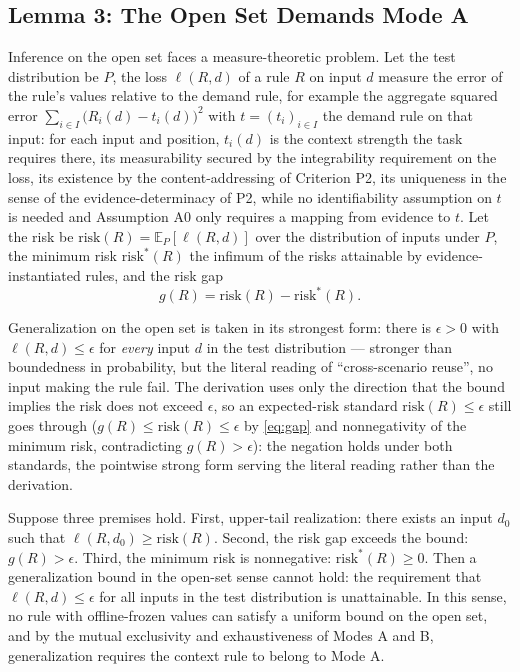 \subsection{Lemma 3: The Open Set Demands Mode A}

Inference on the open set faces a measure-theoretic problem. Let the test distribution be $P$, the loss $\ell(R, d)$ of a rule $R$ on input $d$ measure the error of the rule's values relative to the demand rule, for example the aggregate squared error $\sum_{i \in I} \bigl(R_i(d) - t_i(d)\bigr)^2$ with $t = (t_i)_{i \in I}$ the demand rule on that input: for each input and position, $t_i(d)$ is the context strength the task requires there, its measurability secured by the integrability requirement on the loss, its existence by the content-addressing of Criterion P2, its uniqueness in the sense of the evidence-determinacy of P2, while no identifiability assumption on $t$ is needed and Assumption A0 only requires a mapping from evidence to $t$. Let the risk be $\mathrm{risk}(R) = \mathbb{E}_P [\ell(R, d)]$ over the distribution of inputs under $P$, the minimum risk $\mathrm{risk}^* (R)$ the infimum of the risks attainable by evidence-instantiated rules, and the risk gap
\begin{equation}
g(R) = \mathrm{risk}(R) - \mathrm{risk}^* (R).
\label{eq:gap}
\end{equation}

Generalization on the open set is taken in its strongest form: there is $\epsilon > 0$ with $\ell(R, d) \le \epsilon$ for \emph{every} input $d$ in the test distribution --- stronger than boundedness in probability, but the literal reading of ``cross-scenario reuse'', no input making the rule fail. The derivation uses only the direction that the bound implies the risk does not exceed $\epsilon$, so an expected-risk standard $\mathrm{risk}(R) \le \epsilon$ still goes through ($g(R) \le \mathrm{risk}(R) \le \epsilon$ by \eqref{eq:gap} and nonnegativity of the minimum risk, contradicting $g(R) > \epsilon$): the negation holds under both standards, the pointwise strong form serving the literal reading rather than the derivation.

\begin{lemma}
Suppose three premises hold. First, upper-tail realization: there exists an input $d_0$ such that $\ell(R, d_0) \ge \mathrm{risk}(R)$. Second, the risk gap exceeds the bound: $g(R) > \epsilon$. Third, the minimum risk is nonnegative: $\mathrm{risk}^* (R) \ge 0$. Then a generalization bound in the open-set sense cannot hold: the requirement that $\ell(R, d) \le \epsilon$ for all inputs in the test distribution is unattainable. In this sense, no rule with offline-frozen values can satisfy a uniform bound on the open set, and by the mutual exclusivity and exhaustiveness of Modes A and B, generalization requires the context rule to belong to Mode A.
\end{lemma}

